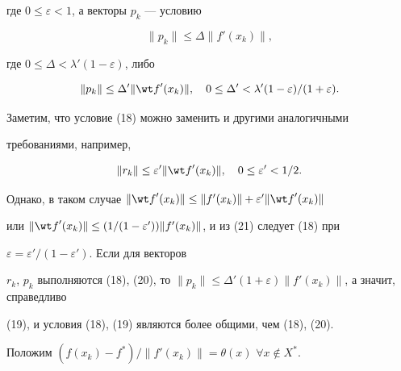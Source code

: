 где $0\le \varepsilon <1$, а векторы $p_k$ --- условию


\begin{equation}


\|{p_k} \|\le \Delta \|{{f}'(x_k)} \|,


\end{equation}


где $0\le \Delta <{\lambda}'(1-\varepsilon)$, либо


\begin{equation}


\|{p_k} \|\le {\Delta}' \|{\wt f}'(x_k) \|,


\quad 0\le {\Delta}'<{\lambda}'(1-\varepsilon)/


(1+\varepsilon).


\end{equation}





Заметим, что условие (18) можно заменить и другими аналогичными


требованиями, например,


\begin{equation}


\|{r_k} \|\le {\varepsilon}' \|{{\wt f}'(x_k)} \|,


\quad 0\le {\varepsilon}'<1/2.


\end{equation}


Однако, в таком случае $\|{{\wt f}'(x_k)} \|\le \|


{{f}'(x_k)} \|+{\varepsilon}' \|{{\wt f}'(x_k)} \|$


или $\|{{\wt f}'(x_k)} \|\le (1/(1-{\varepsilon


}')) \|{{f}'(x_k)} \|$, и из (21) следует (18) при


$\varepsilon ={\varepsilon}'/(1-{\varepsilon}')$. Если для векторов


$r_k$, $p_k$ выполняются (18), (20), то $\|{p_k} \|\le {\Delta


}'(1+\varepsilon) \|{{f}'(x_k)} \|$, а значит, справедливо


(19), и условия (18), (19) являются более общими, чем (18), (20).





Положим $(f(x_k)-f^*)/ \|{{f}'(x_k)}\|=\theta(x)$ $\forall x\notin X^*$.





